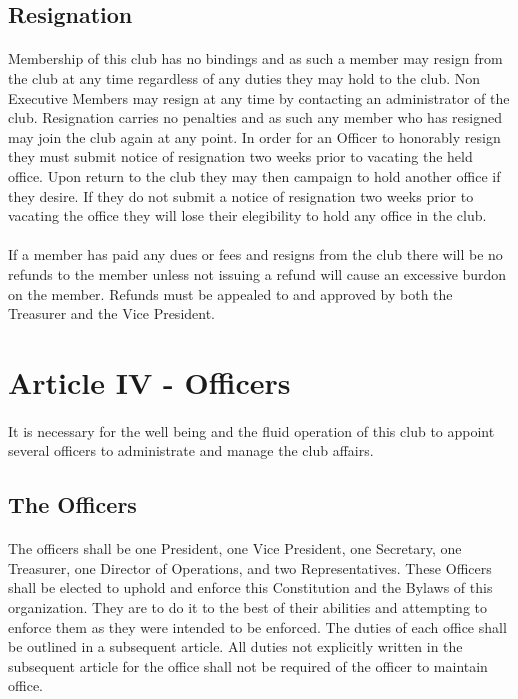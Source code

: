 \documentclass[12pt]{article}
\newcommand{\article}[1]{
\setcounter{section}{0}
\setcounter{subsection}{0}

	\section*{#1}
	\addcontentsline{toc}{section}{#1}
	
}
\begin{document}
\subsection{Resignation}
\paragraph{}
Membership of this club has no bindings and as such a member may resign from the club at any time regardless of any duties they may hold to the club. Non Executive Members may resign at any time by contacting an administrator of the club. Resignation carries no penalties and as such any member who has resigned may join the club again at any point. In order for an Officer to honorably resign they must submit notice of resignation two weeks prior to vacating the held office. Upon return to the club they may then campaign to hold another office if they desire. If they do not submit a notice of resignation two weeks prior to vacating the office they will lose their elegibility to hold any office in the club. 

\paragraph{}
If a member has paid any dues or fees and resigns from the club there will be no refunds to the member unless not issuing a refund will cause an excessive burdon on the member. Refunds must be appealed to and approved by both the Treasurer and the Vice President.


\article{Article IV - Officers}
\paragraph{}
It is necessary for the well being and the fluid operation of this club to appoint several officers to administrate and manage the club affairs.

\subsection{The Officers}
\paragraph{}
The officers shall be one President, one Vice President, one Secretary, one Treasurer, one Director of Operations, and two Representatives. These Officers shall be elected to uphold and enforce this Constitution and the Bylaws of this organization. They are to do it to the best of their abilities and attempting to enforce them as they were intended to be enforced. The duties of each office shall be outlined in a subsequent article. All duties not explicitly written in the subsequent article for the office shall not be required of the officer to maintain office.
\end{document}
